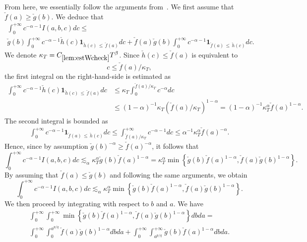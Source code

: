 \documentclass[AHL,Unicode,longabstracts,published]{cedram}
\newcommand{\bfun}{\mathbf{1}}
\begin{document}
From here, we essentially follow the arguments from~\cite{lieb2001analysis}. We first assume that $\check{f}(a) \geq \check{g}(b)$. We deduce that
\begin{multline*}
\int_0^{+\infty} c^{-\alpha-1} I(a,b,c)dc \leq\\
\check{g}(b) \int_0^{+\infty} c^{-\alpha-1} \check{h}(c)\bfun_{\check{h}(c)\,\leq\,\check{f}(a)}dc + \check{f}(a)\check{g}(b)\int_0^{+\infty}c^{-\alpha-1}\bfun_{\check{f}(a)\,\leq\,\check{h}(c) }dc.
\end{multline*}
We denote $\kappa_{T} = C_{\ref{lem:estWcheck}} T^{\beta}$. Since $\check{h}(c) \leq \check{f}(a)$ is equivalent to
\begin{equation*}
c\leq \check{f}(a)/\kappa_{T},
\end{equation*}
the first integral on the right-hand-side is estimated as
\begin{align*}
\int_0^{+\infty} c^{-\alpha-1} \check{h}(c)\bfun_{\check{h}(c)\,\leq\, \check{f}(a)}dc&\leq \kappa_T \int_0^{\check{f}(a)/\kappa_{T}} c^{-\alpha}dc
\\ &\leq (1-\alpha)^{-1}\kappa_T\left(\check{f}(a)/\kappa_{T}\right)^{1 - \alpha} = (1-\alpha)^{-1}\kappa_T^{\alpha} \check{f}(a)^{1-\alpha}.
\end{align*}
The second integral is bounded as
\begin{align*}
\int_0^{+\infty}c^{-\alpha-1}\bfun_{\check{f}(a)\,\leq\,\check{h}(c) }dc \leq \int_{\check{f}(a)/\kappa_{T}}^{+\infty}c^{-\alpha-1}dc \leq \alpha^{-1}\kappa_T^{\alpha} \check{f}(a)^{-\alpha}.
\end{align*}
Hence, since by assumption $\check{g}(b)^{-\alpha}\geq \check{f}(a)^{-\alpha}$, it follows that
\[
\int_0^{+\infty} c^{-\alpha-1} I(a,b,c)dc \lesssim_{\alpha} \kappa_T^{\alpha} \check{g}(b)\check{f}(a)^{1-\alpha} = \kappa_T^{\alpha} \min\left\{\check{g}(b)\check{f}(a)^{1-\alpha},\check{f}(a)\check{g}(b)^{1-\alpha}\right\}.
\]
By assuming that $\check{f}(a) \leq \check{g}(b)$ and following the same arguments, we obtain
\[
\int_0^{+\infty} c^{-\alpha-1} I(a,b,c)dc \lesssim_{\alpha} \kappa_T^{\alpha} \min\left\{\check{g}(b)\check{f}(a)^{1-\alpha}, \check{f}(a)\check{g}(b)^{1-\alpha}\right\}.
\]
We then proceed by integrating with respect to $b$ and $a$. We have
\begin{multline*}
\int_0^{+\infty} \int_0^{+\infty} \min\left\{ \check{g}(b)\check{f}(a)^{1-\alpha}, \check{f}(a)\check{g}(b)^{1-\alpha}\right\} db da =\\
\int_0^{+\infty}\int_0^{a^{p/q}}\check{f}(a)\check{g}(b)^{1-\alpha}dbda+\int_0^{+\infty}\int_{a^{p/q}}^{+\infty} \check{g}(b)\check{f}(a)^{1-\alpha} db da.
\end{multline*}
\end{document}
